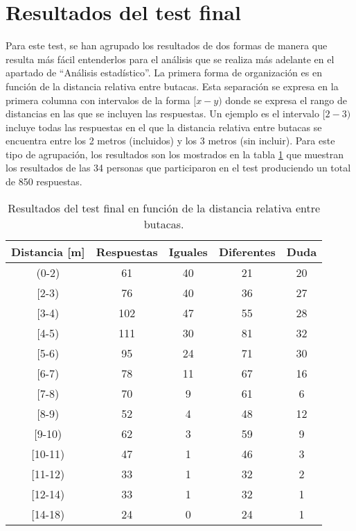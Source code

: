 \documentclass[11pt,a4paper,twoside]{book}
\begin{document}
	\section{Resultados del test final}
	    Para este test, se han agrupado los resultados de dos formas de manera que resulta más fácil entenderlos para el análisis que se realiza más adelante en el apartado de ``Análisis estadístico''. La primera forma de organización es en función de la distancia relativa entre butacas. Esta separación se expresa en la primera columna con intervalos de la forma $[x-y)$ donde se expresa el rango de distancias en las que se incluyen las respuestas. Un ejemplo es el intervalo $[2-3)$ incluye todas las respuestas en el que la distancia relativa entre butacas se encuentra entre los 2 metros (incluidos) y los 3 metros (sin incluir). Para este tipo de agrupación, los resultados son los mostrados en la tabla \ref{tablaTestButacas} que muestran los resultados de las 34 personas que participaron en el test produciendo un total de 850 respuestas.
	    
	    \begin{table}[H]
			\begin{center}
			\begin{scriptsize}
			\begin{tabular}{| c | c | c | c | c |}
			    \hline
				\textbf{Distancia [m]}&\textbf{Respuestas}&\textbf{Iguales}&\textbf{Diferentes}&\textbf{Duda}\\ \hline
                (0-2)&61&40&21&20\\ \hline
                [2-3)&76&40&36&27\\ \hline
                [3-4)&102&47&55&28\\ \hline
                [4-5)&111&30&81&32\\ \hline
                [5-6)&95&24&71&30\\ \hline
                [6-7)&78&11&67&16\\ \hline
                [7-8)&70&9&61&6\\ \hline
                [8-9)&52&4&48&12\\ \hline
                [9-10)&62&3&59&9\\ \hline
                [10-11)&47&1&46&3\\ \hline
                [11-12)&33&1&32&2\\ \hline
                [12-14)&33&1&32&1\\ \hline
                [14-18)&24&0&24&1\\ \hline
			\end{tabular}
			\caption{Resultados del test final en función de la distancia relativa entre butacas.}
			\label{tablaTestButacas}
			\end{scriptsize}
			\end{center}	
		\end{table}
		
\end{document}
